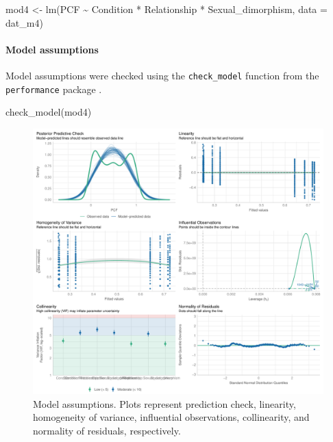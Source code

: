 \documentclass[
  bookmarksnumbered]{article}
\newenvironment{Shaded}{\begin{snugshade}}{\end{snugshade}}
\newcommand{\AttributeTok}[1]{\textcolor[rgb]{0.80,0.80,0.80}{#1}}
\newcommand{\FunctionTok}[1]{\textcolor[rgb]{0.94,0.94,0.56}{#1}}
\newcommand{\NormalTok}[1]{\textcolor[rgb]{0.80,0.80,0.80}{#1}}
\newcommand{\OtherTok}[1]{\textcolor[rgb]{0.94,0.94,0.56}{#1}}
\newcommand{\SpecialCharTok}[1]{\textcolor[rgb]{0.86,0.64,0.64}{#1}}
\begin{document}
\begin{Shaded}
\begin{Highlighting}[]
\NormalTok{mod4 }\OtherTok{\textless{}{-}} \FunctionTok{lm}\NormalTok{(PCF }\SpecialCharTok{\textasciitilde{}}\NormalTok{ Condition }\SpecialCharTok{*}\NormalTok{ Relationship }\SpecialCharTok{*}\NormalTok{ Sexual\_dimorphism,}
            \AttributeTok{data =}\NormalTok{ dat\_m4)}
\end{Highlighting}
\end{Shaded}

\paragraph{Model assumptions}\label{model-assumptions-3}

Model assumptions were checked using the \texttt{check\_model} function from the \texttt{performance} package \autocite{ludecke2021}.

\begin{Shaded}
\begin{Highlighting}[]
\FunctionTok{check\_model}\NormalTok{(mod4)}
\end{Highlighting}
\end{Shaded}

\begin{figure}
\centering
\includegraphics{Supplementary_material_files/figure-latex/assu-mod4-1.pdf}
\caption{\label{fig:assu-mod4}Model assumptions. Plots represent prediction check, linearity, homogeneity of variance, influential observations, collinearity, and normality of residuals, respectively.}
\end{figure}
\end{document}
